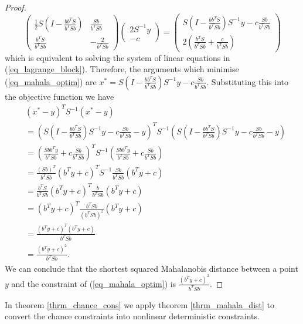 \begin{proof}
\begin{equation}
\begin{pmatrix}
\frac{1}{2}S(I-\frac{bb^TS}{b^TSb}) & \frac{Sb}{b^TSb} \\ \frac{b^TS}{b^TSb} & -\frac{2}{b^TSb} \end{pmatrix} \begin{pmatrix}
2S^{-1}y \\ -c
\end{pmatrix} = \begin{pmatrix}
S(I-\frac{bb^TS}{b^TSb})S^{-1}y - c\frac{Sb}{b^TSb} \\
2(\frac{b^TS}{b^TSb} + \frac{c}{b^TSb})
\end{pmatrix}
\label{eq_lagrange_args}
\end{equation}
which is equivalent to solving the system of linear equations in (\ref{eq_lagrange_block}). Therefore, the arguments which minimise (\ref{eq_mahala_optim}) are $x^* = S(I-\frac{bb^TS}{b^TSb})S^{-1}y - c\frac{Sb}{b^TSb}$. Substituting this into the objective function we have
\begin{equation}
\begin{aligned}
&\left(x^*-y\right)^TS^{-1}\left(x^*-y\right) \\ 
&= \left(S\left(I-\frac{bb^TS}{b^TSb}\right)S^{-1}y - c\frac{Sb}{b^TSb}-y\right)^TS^{-1}\left( S \left(I-\frac{bb^TS}{b^TSb}\right)S^{-1}y - c \frac{Sb}{b^TSb}-y\right) \\ 
&= \left(\frac{Sbb^Ty}{b^TSb} + c\frac{Sb}{b^TSb}\right)^TS^{-1}\left(\frac{Sbb^Ty}{b^TSb}+ c\frac{Sb}{b^TSb}\right) \\
&= \frac{(Sb)^T}{b^TSb}\left( b^Ty+c \right)^TS^{-1}\frac{Sb}{b^TSb}\left(b^Ty+c\right) \\
&= \frac{b^TS}{b^TSb}\left(b^Ty+c\right)^T\frac{b}{b^TSb}\left(b^Ty+c\right) \\
&= \left(b^Ty+c\right)^T\frac{b^TSb}{(b^TSb)^2}\left(b^Ty+c\right) \\
&= \frac{(b^Ty+c)^T(b^Ty+c)}{b^TSb} \\
&= \frac{(b^Ty+c)^2}{b^TSb}.
\end{aligned}
\label{eq_lagrange_min}
\end{equation}
We can conclude that the shortest squared Mahalanobis distance between a point $y$ and the constraint of (\ref{eq_mahala_optim}) is $\frac{(b^Ty+c)^2}{b^TSb}$.
\end{proof}
In theorem \ref{thrm_chance_cons} we apply theorem \ref{thrm_mahala_dist} to convert the chance constraints into nonlinear deterministic constraints.
